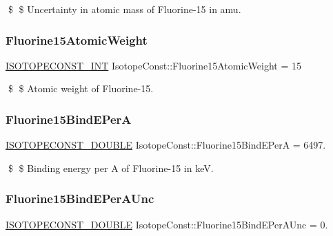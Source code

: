 \$ \$ Uncertainty in atomic mass of Fluorine-\/15 in amu. \mbox{\label{group___isotope_const-_fluorine-_f15_gabfac3c09ed658b4ef5f64a78e0e297e5}} 
\subsubsection{\texorpdfstring{Fluorine15\+Atomic\+Weight}{Fluorine15AtomicWeight}}
{\footnotesize\ttfamily \mbox{\hyperlink{group___isotope_const-_macros_ga5f18360b3e99483a35c32d789e62621c}{I\+S\+O\+T\+O\+P\+E\+C\+O\+N\+S\+T\+\_\+\+I\+NT}} Isotope\+Const\+::\+Fluorine15\+Atomic\+Weight = 15}

\$ \$ Atomic weight of Fluorine-\/15. \mbox{\label{group___isotope_const-_fluorine-_f15_gac0bfef2130031ba6357b5f16ecc74a09}} 
\subsubsection{\texorpdfstring{Fluorine15\+Bind\+E\+PerA}{Fluorine15BindEPerA}}
{\footnotesize\ttfamily \mbox{\hyperlink{group___isotope_const-_macros_ga8f45a7272ce02c0b4c65c44636ed719a}{I\+S\+O\+T\+O\+P\+E\+C\+O\+N\+S\+T\+\_\+\+D\+O\+U\+B\+LE}} Isotope\+Const\+::\+Fluorine15\+Bind\+E\+PerA = 6497.}

\$ \$ Binding energy per A of Fluorine-\/15 in keV. \mbox{\label{group___isotope_const-_fluorine-_f15_ga8d42f715de54ff3f130a5210b6e11065}} 
\subsubsection{\texorpdfstring{Fluorine15\+Bind\+E\+Per\+A\+Unc}{Fluorine15BindEPerAUnc}}
{\footnotesize\ttfamily \mbox{\hyperlink{group___isotope_const-_macros_ga8f45a7272ce02c0b4c65c44636ed719a}{I\+S\+O\+T\+O\+P\+E\+C\+O\+N\+S\+T\+\_\+\+D\+O\+U\+B\+LE}} Isotope\+Const\+::\+Fluorine15\+Bind\+E\+Per\+A\+Unc = 0.}

